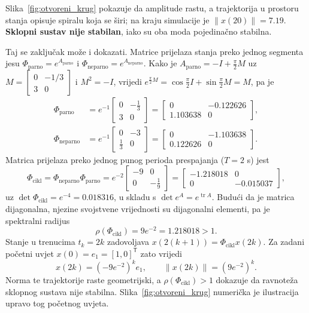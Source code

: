 Slika~\ref{fig:otvoreni_krug} pokazuje da amplitude rastu, a trajektorija u prostoru stanja opisuje spiralu koja se širi; na kraju simulacije je $\|x(20)\| = 7.19$. \textbf{Sklopni sustav nije stabilan}, iako su oba moda pojedinačno stabilna.

Taj se zaključak može i dokazati. Matrice prijelaza stanja preko jednog segmenta jesu $\Phi_{\mathrm{parno}} = e^{A_{\mathrm{parno}}}$ i $\Phi_{\mathrm{neparno}} = e^{A_{\mathrm{neparno}}}$. Kako je $A_{\mathrm{parno}} = -I + \frac{\pi}{2} M$ uz $M = \left[\begin{smallmatrix} 0 & -1/3 \\ 3 & 0 \end{smallmatrix}\right]$ i $M^2 = -I$, vrijedi $e^{\frac{\pi}{2}M} = \cos\frac{\pi}{2} I + \sin\frac{\pi}{2} M = M$, pa je
\begin{align}
\Phi_{\mathrm{parno}} &= e^{-1} \begin{bmatrix} 0 & -\frac{1}{3} \\[2pt] 3 & 0 \end{bmatrix}
= \begin{bmatrix} 0 & -0.122626 \\ 1.103638 & 0 \end{bmatrix}, \\
\Phi_{\mathrm{neparno}} &= e^{-1} \begin{bmatrix} 0 & -3 \\[2pt] \frac{1}{3} & 0 \end{bmatrix}
= \begin{bmatrix} 0 & -1.103638 \\ 0.122626 & 0 \end{bmatrix}.
\end{align}
Matrica prijelaza preko jednog punog perioda prespajanja ($T = 2$ s) jest
\begin{equation}
\Phi_{\mathrm{cikl}} = \Phi_{\mathrm{neparno}} \Phi_{\mathrm{parno}}
= e^{-2} \begin{bmatrix} -9 & 0 \\ 0 & -\frac{1}{9} \end{bmatrix}
= \begin{bmatrix} -1.218018 & 0 \\ 0 & -0.015037 \end{bmatrix},
\end{equation}
uz $\det \Phi_{\mathrm{cikl}} = e^{-4} = 0.018316$, u skladu s $\det e^{A} = e^{\operatorname{tr} A}$. Budući da je matrica dijagonalna, njezine svojstvene vrijednosti su dijagonalni elementi, pa je spektralni radijus
\begin{equation}
\rho(\Phi_{\mathrm{cikl}}) = 9 e^{-2} = 1.218018 > 1 .
\end{equation}
Stanje u trenucima $t_k = 2k$ zadovoljava $x(2(k+1)) = \Phi_{\mathrm{cikl}}x(2k)$. Za zadani početni uvjet $x(0)=e_1=[1,0]^{\mathsf{T}}$ zato vrijedi
\begin{equation}
x(2k)=(-9e^{-2})^k e_1, \qquad \|x(2k)\|=(9e^{-2})^k.
\end{equation}
Norma te trajektorije raste geometrijski, a $\rho(\Phi_{\mathrm{cikl}})>1$ dokazuje da ravnoteža sklopnog sustava nije stabilna. Slika~\ref{fig:otvoreni_krug} numerička je ilustracija upravo tog početnog uvjeta.

